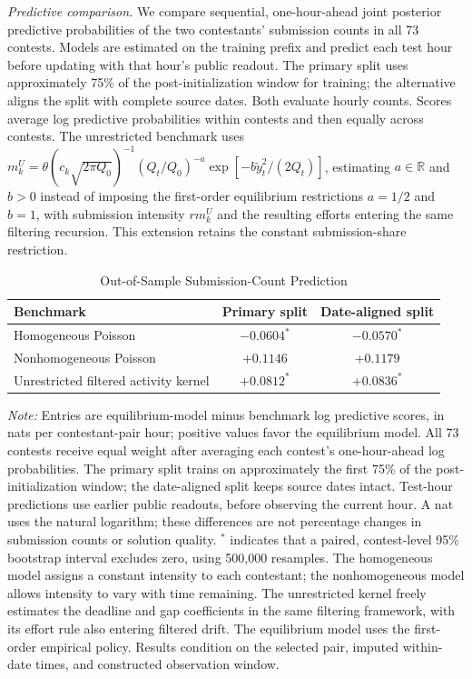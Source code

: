 \documentclass[mnsc]{informs3}
\newcommand{\figtabnotesize}{\TableSpaced\footnotesize}
\begin{document}
\begin{APPENDICES}
\textit{Predictive comparison.} {We compare sequential, one-hour-ahead joint posterior predictive probabilities of the two contestants' submission counts in all 73 contests.} Models are estimated on the training prefix and predict each test hour before updating with that hour's public readout. The primary split uses approximately 75\% of the post-initialization window for training; the alternative aligns the split with complete source dates. Both evaluate hourly counts. Scores average log predictive probabilities within contests and then equally across contests.
The unrestricted benchmark uses $m_k^{U}=\theta(c_k\sqrt{2\pi Q_0})^{-1}(Q_t/Q_0)^{-a}\exp[-b\tilde y_t^2/(2Q_t)]$, estimating $a\in\mathbb R$ and $b>0$ instead of imposing the first-order equilibrium restrictions $a=1/2$ and $b=1$, with submission intensity $rm_k^{U}$ and the resulting efforts entering the same filtering recursion. {This extension retains the constant submission-share restriction.}

\begin{table}[!htbp]
\centering
\caption{Out-of-Sample Submission-Count Prediction}
\label{tab-submission-prediction}
\small
\begin{tabularx}{\textwidth}{>{\raggedright\arraybackslash}Xcc}
\toprule
Benchmark & Primary split & Date-aligned split\\
\midrule
Homogeneous Poisson & $-0.0604^{*}$ & $-0.0570^{*}$\\
Nonhomogeneous Poisson & $+0.1146$ & $+0.1179$\\
Unrestricted filtered activity kernel & $+0.0812^{*}$ & $+0.0836^{*}$\\
\bottomrule
\end{tabularx}
\par\vspace{0.5ex}
\begin{minipage}{\textwidth}\figtabnotesize
\footnotesize\textit{Note:} Entries are equilibrium-model minus benchmark log predictive scores, in nats per contestant-pair hour; positive values favor the equilibrium model. {All 73 contests receive equal weight after averaging each contest's one-hour-ahead log probabilities. The primary split trains on approximately the first 75\% of the post-initialization window; the date-aligned split keeps source dates intact. Test-hour predictions use earlier public readouts, before observing the current hour. A nat uses the natural logarithm; these differences are not percentage changes in submission counts or solution quality.} $^{*}$ indicates that a paired, contest-level 95\% bootstrap interval excludes zero, using 500,000 resamples. The homogeneous model assigns a constant intensity to each contestant; the nonhomogeneous model allows intensity to vary with time remaining. The unrestricted kernel freely estimates the deadline and gap coefficients in the same filtering framework, with its effort rule also entering filtered drift. The equilibrium model uses the first-order empirical policy. Results condition on the selected pair, imputed within-date times, and constructed observation window.
\end{minipage}
\end{table}


\end{APPENDICES}
\end{document}
